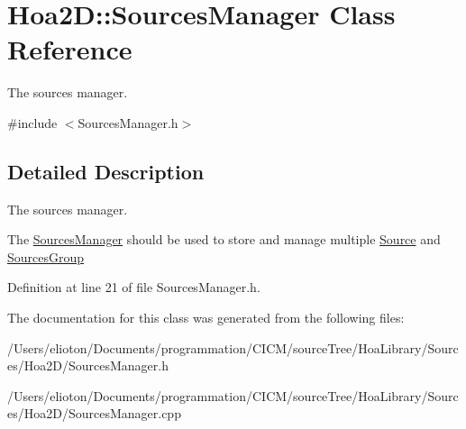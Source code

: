 \hypertarget{class_hoa2_d_1_1_sources_manager}{\section{Hoa2\-D\-:\-:Sources\-Manager Class Reference}
\label{class_hoa2_d_1_1_sources_manager}
}


The sources manager.  




{\ttfamily \#include $<$Sources\-Manager.\-h$>$}



\subsection{Detailed Description}
The sources manager. 

The \hyperlink{class_hoa2_d_1_1_sources_manager}{Sources\-Manager} should be used to store and manage multiple \hyperlink{class_hoa2_d_1_1_source}{Source} and \hyperlink{class_hoa2_d_1_1_sources_group}{Sources\-Group} 

Definition at line 21 of file Sources\-Manager.\-h.



The documentation for this class was generated from the following files\-:\begin{DoxyCompactItemize}
\item 
/\-Users/elioton/\-Documents/programmation/\-C\-I\-C\-M/source\-Tree/\-Hoa\-Library/\-Sources/\-Hoa2\-D/Sources\-Manager.\-h\item 
/\-Users/elioton/\-Documents/programmation/\-C\-I\-C\-M/source\-Tree/\-Hoa\-Library/\-Sources/\-Hoa2\-D/Sources\-Manager.\-cpp\end{DoxyCompactItemize}
